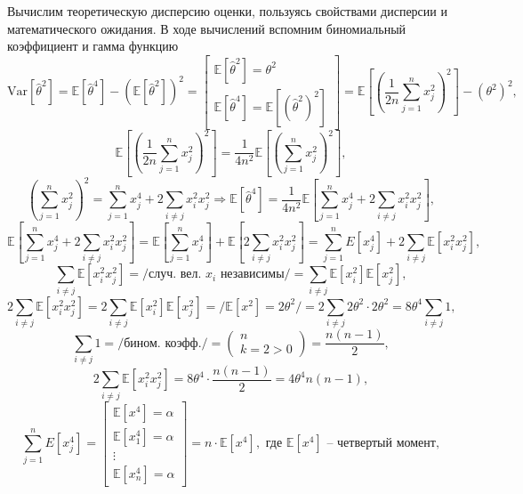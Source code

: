 \documentclass[a4paper, 12pt]{article}
\begin{document}
    Вычислим теоретическую дисперсию оценки, пользуясь свойствами дисперсии и математического ожидания. В ходе вычислений вспомним биномиальный коэффициент и гамма функцию
    $$\text{Var}{\left[\hat{\theta}^2\right]}=\mathbb{E}\left[\hat{\theta}^4\right]-\left(\mathbb{E}\left[\hat{\theta}^2\right]\right)^2
    =\begin{bmatrix}
        \mathbb{E}\left[\hat{\theta}^2\right]=\theta^2\\
        \mathbb{E}\left[\hat{\theta}^4\right]=\mathbb{E}\left[\left(\hat{\theta}^2\right)^2\right]
    \end{bmatrix}
    =\mathbb{E}\left[\left(\dfrac{1}{2n}\sum\limits_{j=1}^{n}x_j^2\right)^2\right]-\left(\theta^2\right)^2,$$
    $$\mathbb{E}\left[\left(\dfrac{1}{2n}\sum\limits_{j=1}^{n}x_j^2\right)^2\right]=\dfrac{1}{4n^2}\mathbb{E}\left[\left(\sum\limits_{j=1}^{n}x_j^2\right)^2\right],$$
    $$\left(\sum\limits_{j=1}^{n}x_j^2\right)^2=\sum\limits_{j=1}^{n}x_j^4+2\sum\limits_{i\neq j}x_i^2x_j^2\Rightarrow \mathbb{E}\left[\hat{\theta}^4\right]=\dfrac{1}{4n^2}\mathbb{E}\left[\sum\limits_{j=1}^{n}x_j^4+2\sum\limits_{i\neq j}x_i^2x_j^2\right],$$
    $$\mathbb{E}\left[\sum\limits_{j=1}^{n}x_j^4+2\sum\limits_{i\neq j}x_i^2x_j^2\right]=\mathbb{E}\left[\sum\limits_{j=1}^{n}x_j^4\right]+\mathbb{E}\left[2\sum\limits_{i\neq{j}}x_i^2x_j^2\right]=
    \sum\limits_{j=1}^{n}E\left[x_j^4\right]+2\sum\limits_{i\neq{j}}\mathbb{E}\left[x_i^2x_j^2\right],$$
    $$\sum\limits_{i\neq{j}}\mathbb{E}\left[x_i^2x_j^2\right]=/\text{случ. вел. }x_i \text{ независимы}/=\sum\limits_{i\neq{j}}\mathbb{E}\left[x_i^2\right]\mathbb{E}\left[x_j^2\right],$$
    $$2\sum\limits_{i\neq{j}}\mathbb{E}\left[x_i^2x_j^2\right]=2\sum\limits_{i\neq{j}}\mathbb{E}\left[x_i^2\right]\mathbb{E}\left[x_j^2\right]=/\mathbb{E}\left[x^2\right]=2\theta^2/=2\sum\limits_{i\neq{j}}2\theta^2\cdot2\theta^2=8\theta^4\sum\limits_{i\neq{j}}1,$$
    $$\sum\limits_{i\neq{j}}1=
    /\text{бином. коэфф.}/=
    \begin{pmatrix}
        n\\
        k=2>0
    \end{pmatrix}
    =\dfrac{n\left(n-1\right)}{2},$$
    $$2\sum\limits_{i\neq{j}}\mathbb{E}\left[x_i^2x_j^2\right]=8\theta^4\cdot\dfrac{n\left(n-1\right)}{2}=4\theta^4n\left(n-1\right),$$
    $$\sum\limits_{j=1}^{n}E\left[x_j^4\right]=
    \begin{bmatrix}
        \mathbb{E}\left[x^4\right]=\alpha\\
        \mathbb{E}\left[x_1^4\right]=\alpha\\
        \vdots \\
        \mathbb{E}\left[x_n^4\right]=\alpha
    \end{bmatrix}=
    n\cdot\mathbb{E}\left[x^4\right],\text{ где }\mathbb{E}\left[x^4\right]\text{ -- четвертый момент},$$
\end{document}
